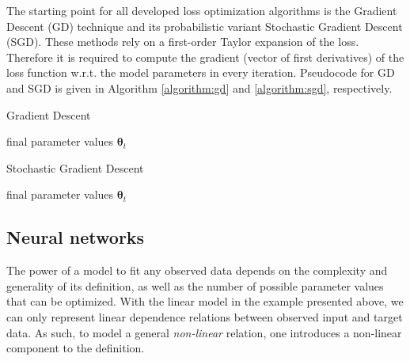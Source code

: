 The starting point for all developed loss optimization algorithms is the Gradient Descent (GD) technique and its probabilistic variant Stochastic Gradient Descent (SGD). These methods rely on a first-order Taylor expansion of the loss. Therefore it is required to compute the gradient (vector of first derivatives) of the loss function w.r.t. the model parameters in every iteration. Pseudocode for GD and SGD is given in Algorithm \ref{algorithm:gd} and \ref{algorithm:sgd}, respectively.

\begin{algorithm}
\caption{Gradient Descent}
\label{algorithm:gd}
\begin{algorithmic}
\ENDWHILE
\RETURN final parameter values $\pmb{\theta}_{t}$
\end{algorithmic}
\end{algorithm} 

\begin{algorithm}
\caption{Stochastic Gradient Descent}
\label{algorithm:sgd}
\begin{algorithmic}
\ENDWHILE
\RETURN final parameter values $\pmb{\theta}_{t}$
\end{algorithmic}
\end{algorithm} 


\subsection{Neural networks}
The power of a model to fit any observed data depends on the complexity and generality of its definition, as well as the number of possible parameter values that can be optimized. With the linear model in the example presented above, we can only represent linear dependence relations between observed input and target data. As such, to model a general \emph{non-linear} relation, one introduces a non-linear component to the definition.

